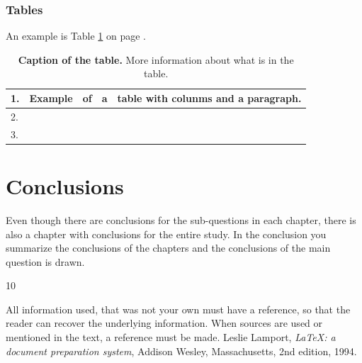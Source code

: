\documentclass[11pt, a4paper, twoside]{report}
\begin{document}
  \subsection{Tables}
     An example is Table \ref{table: Example} on page \pageref{table: Example}.

	\begin{table}[htbp] 
	\centering  
	\begin{tabular}{|l|l|l|l|p{3cm}|}
	  \hline
	  1. & Example & of & a & table with colunms and a paragraph. \\ \hline
	  2. &         &    &   &        \\ \hline
	  3. &         &    &   &        \\ \hline
	\end{tabular}
	\caption{\textbf{Caption of the table.} More information about what is in the table.}
	\label{table: Example}
	\end{table}


\chapter{Conclusions} 
Even though there are conclusions for the sub-questions in each chapter, there is also a chapter with conclusions for the entire study. In the conclusion you summarize the conclusions of the chapters and the conclusions of the main question is drawn. 


\begin{thebibliography}{10}  %

 All information used, that was not your own must have a reference, so that the reader can recover the underlying information. When sources are used or mentioned in the text, a reference must be made. %
 Leslie Lamport,
  \textit{\LaTeX: a document preparation system},
  Addison Wesley, Massachusetts,
  2nd edition,
  1994. 
\end{thebibliography}  

\appendix     
\end{document}
